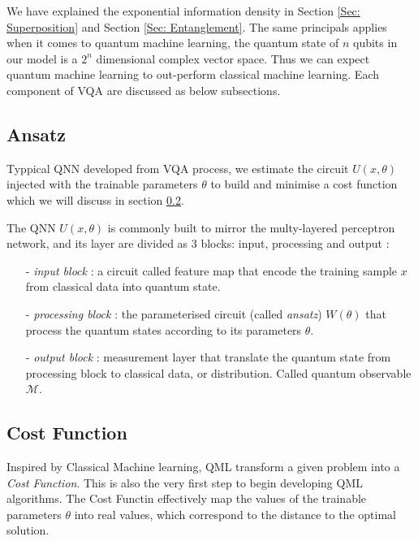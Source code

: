 We have explained the exponential information density in Section \ref{Sec: Superposition} and Section \ref{Sec: Entanglement}.
The same principals applies when it comes to quantum machine learning, the quantum state of $n$ qubits in our model is a $2^n$ dimensional complex vector space.
Thus we can expect quantum machine learning to out-perform classical machine learning.
Each component of VQA are discussed as below subsections.

\subsection{Ansatz} \label{Sec: Ansatz}

Typpical QNN developed from VQA process, we estimate the circuit $U(x,\theta)$ injected with the trainable parameters $\theta$ to build and minimise a cost function which we will discuss in section \ref{Sec: Cost Function}.

The QNN $U(x,\theta)$ is commonly built to mirror the multy-layered perceptron network, and its layer are divided as 3 blocks: input, processing and output \cite{cerezoVariationalQuantumAlgorithms2021}:

\begin{itemize}[align=left]
    \item[- \emph{input block}]: a circuit called feature map that encode the training sample $x$ from classical data into quantum state.
    \item[- \emph{processing block}]: the parameterised circuit (called \emph{ansatz}) $W(\theta)$ that process the quantum states according to its parameters $\theta$.
    \item[- \emph{output block}]: measurement layer that translate the quantum state from processing block to classical data, or distribution. Called quantum observable $\mathcal{M}$.
\end{itemize}

\subsection{Cost Function} \label{Sec: Cost Function}

Inspired by Classical Machine learning, QML transform a given problem into a \emph{Cost Function}.
This is also the very first step to begin developing QML algorithms.
The Cost Functin effectively map the values of the trainable parameters $\theta$ into real values, which correspond to the distance to the optimal solution.

